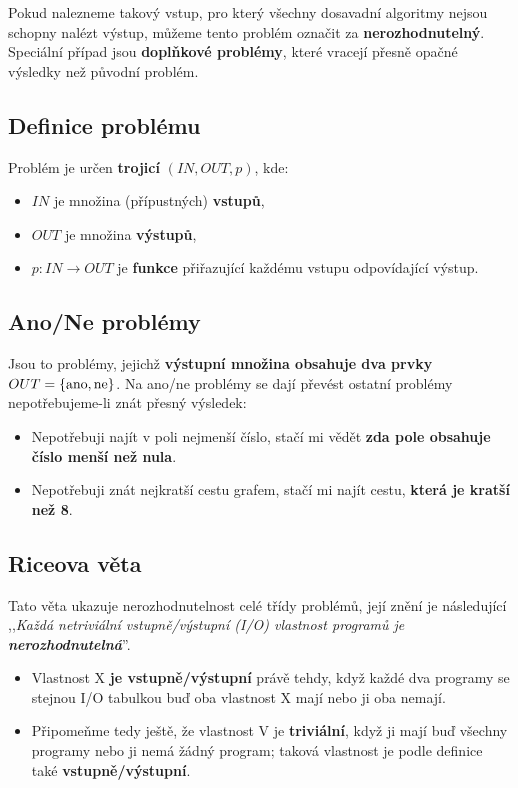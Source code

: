 Pokud nalezneme takový vstup, pro který všechny dosavadní algoritmy nejsou schopny nalézt výstup, můžeme tento problém označit za \textbf{nerozhodnutelný}. Speciální případ jsou \textbf{doplňkové problémy}, které vracejí přesně opačné výsledky než původní problém.

\subsection{Definice problému}
Problém je určen \textbf{trojicí} $(IN, OUT, p)$, kde:
\begin{itemize}
    \item $IN$ je množina (přípustných) \textbf{vstupů},
    \item $OUT$ je množina \textbf{výstupů},
    \item $p: IN \rightarrow OUT$ je \textbf{funkce} přiřazující každému vstupu odpovídající výstup.
\end{itemize}

\subsection{Ano/Ne problémy}
Jsou to problémy, jejichž \textbf{výstupní množina obsahuje dva prvky} $OUT=\{\rm ano, ne\}$.
Na ano/ne problémy se dají převést ostatní problémy nepotřebujeme-li znát přesný výsledek:
\begin{itemize}
    \item Nepotřebuji najít v poli nejmenší číslo, stačí mi vědět \textbf{zda pole obsahuje číslo menší než nula}.
    \item Nepotřebuji znát nejkratší cestu grafem, stačí mi najít cestu, \textbf{která je kratší než 8}.
\end{itemize}

\subsection{Riceova věta}
Tato věta ukazuje nerozhodnutelnost celé třídy problémů, její znění je následující ,,\textit{Každá netriviální vstupně/výstupní (I/O) vlastnost programů je \textbf{nerozhodnutelná}}''.

\begin{itemize}
    \item Vlastnost X \textbf{je vstupně/výstupní} právě tehdy, když každé dva programy se stejnou I/O tabulkou buď oba vlastnost X mají nebo ji oba nemají.
    \item Připomeňme tedy ještě, že vlastnost V je \textbf{triviální}, když ji mají buď všechny programy nebo ji nemá žádný program; taková vlastnost je podle definice také \textbf{vstupně/výstupní}.
\end{itemize}

